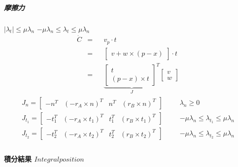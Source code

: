 \subparagraph{摩擦力}

\begin{itemize}
            $|\lambda_t|\leq\mu\lambda_n$
            $-\mu\lambda_n\leq\lambda_t\leq\mu\lambda_n$
        \begin{equation}
            \begin{aligned}
                \dot{C} &=&& v_p \cdot t \\
                        &=&& \begin{bmatrix}v+w\times(p-x)\end{bmatrix}\cdot t \\
                        &=&& \underbrace{\begin{bmatrix}t\\(p-x)\times t\end{bmatrix}^T}_J \begin{bmatrix}v\\w\end{bmatrix}
            \end{aligned}
        \end{equation}
        \begin{equation}
            \begin{aligned}
                J_n=\begin{bmatrix}-n^T & (-r_A\times n)^T & n^T & (r_B\times n)^T\end{bmatrix}             &&& \lambda_n\geq0 \\
                J_{t_1}=\begin{bmatrix}-t_1^T & (-r_A\times t_1)^T & t_1^T & (r_B\times t_1)^T\end{bmatrix} &&& -\mu\lambda_n\leq\lambda_{t_1}\leq\mu\lambda_n \\
                J_{t_2}=\begin{bmatrix}-t_2^T & (-r_A\times t_2)^T & t_2^T & (r_B\times t_2)^T\end{bmatrix} &&& -\mu\lambda_n\leq\lambda_{t_2}\leq\mu\lambda_n \\
            \end{aligned}
        \end{equation}
\end{itemize}

\paragraph{積分結果 \(Integral position\)}

